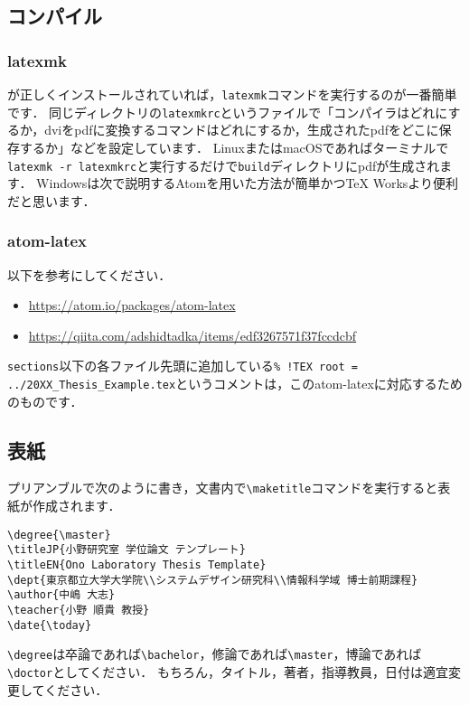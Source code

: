 \subsection{コンパイル}

\subsubsection{latexmk}
\TeXLive{}が正しくインストールされていれば，\texttt{latexmk}コマンドを実行するのが一番簡単です．
同じディレクトリの\texttt{latexmkrc}というファイルで「コンパイラはどれにするか，dviをpdfに変換するコマンドはどれにするか，生成されたpdfをどこに保存するか」などを設定しています．
LinuxまたはmacOSであればターミナルで\texttt{latexmk -r latexmkrc}と実行するだけで\texttt{build}ディレクトリにpdfが生成されます．
Windowsは次で説明するAtomを用いた方法が簡単かつTeX Worksより便利だと思います．

\subsubsection{atom-latex}
以下を参考にしてください．
\begin{itemize}
  \item \url{https://atom.io/packages/atom-latex}
  \item \url{https://qiita.com/adshidtadka/items/edf3267571f37fccdcbf}
\end{itemize}
\texttt{sections}以下の各ファイル先頭に追加している\texttt{\% !TEX root = ../20XX\_Thesis\_Example.tex}というコメントは，このatom-latexに対応するためのものです．

\subsection{表紙}
プリアンブルで次のように書き，文書内で\verb|\maketitle|コマンドを実行すると表紙が作成されます．
\begin{verbatim}
\degree{\master}
\titleJP{小野研究室 学位論文 テンプレート}
\titleEN{Ono Laboratory Thesis Template}
\dept{東京都立大学大学院\\システムデザイン研究科\\情報科学域 博士前期課程}
\author{中嶋 大志}
\teacher{小野 順貴 教授}
\date{\today}
\end{verbatim}
\verb|\degree|は卒論であれば\verb|\bachelor|，修論であれば\verb|\master|，博論であれば\verb|\doctor|としてください．
もちろん，タイトル，著者，指導教員，日付は適宜変更してください．

